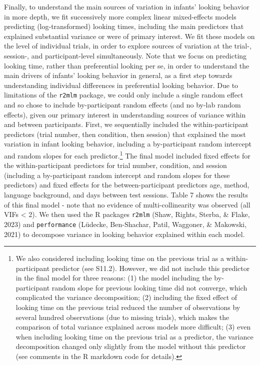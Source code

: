 \documentclass[
  english,
  man, donotrepeattitle,floatsintext]{apa6}
\begin{document}
Finally, to understand the main sources of variation in infants' looking behavior in more depth, we fit successively more complex linear mixed-effects models predicting (log-transformed) looking times, including the main predictors that explained substantial variance or were of primary interest.
We fit these models on the level of individual trials, in order to explore sources of variation at the trial-, session-, and participant-level simultaneously.
Note that we focus on predicting looking time, rather than preferential looking per se, in order to understand the main drivers of infants' looking behavior in general, as a first step towards understanding individual differences in preferential looking behavior.
Due to limitations of the \texttt{r2mlm} package, we could only include a single random effect and so chose to include by-participant random effects (and no by-lab random effects), given our primary interest in understanding sources of variance within and between participants.
First, we sequentially included the within-participant predictors (trial number, then condition, then session) that explained the most variation in infant looking behavior, including a by-participant random intercept and random slopes for each predictor.\footnote{We also considered including looking time on the previous trial as a within-participant predictor (see S11.2). However, we did not include this predictor in the final model for three reasons:
  (1) the model including the by-participant random slope for previous looking time did not converge, which complicated the variance decomposition; (2) including the fixed effect of looking time on the previous trial reduced the number of observations by several hundred observations (due to missing trials), which makes the comparison of total variance explained across models more difficult; (3) even when including looking time on the previous trial as a predictor, the variance decomposition changed only slightly from the model without this predictor (see comments in the R markdown code for details).}
The final model included fixed effects for the within-participant predictors for trial number, condition, and session (including a by-participant random intercept and random slopes for these predictors) and fixed effects for the between-participant predictors age, method, language background, and days between test sessions.
Table 7 shows the results of this final model - note that no evidence of multi-collinearity was observed (all VIFs \textless{} 2).
We then used the R packages \texttt{r2mlm} (Shaw, Rights, Sterba, \& Flake, 2023) and \texttt{performance} (Lüdecke, Ben-Shachar, Patil, Waggoner, \& Makowski, 2021) to decompose variance in looking behavior explained within each model.
\end{document}
